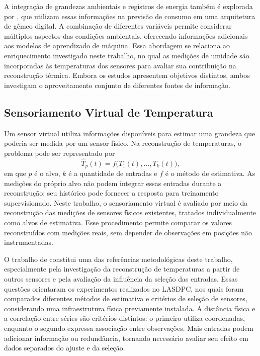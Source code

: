 A integração de grandezas ambientais e registros de energia também
é explorada por , que utilizam essas
informações na previsão de consumo em uma arquitetura de gêmeo digital. A combinação de diferentes variáveis permite considerar múltiplos aspectos das condições ambientais, oferecendo informações adicionais aos modelos de aprendizado de máquina. Essa abordagem se relaciona ao enriquecimento investigado neste trabalho, no qual as medições de umidade são incorporadas às temperaturas dos sensores para avaliar sua contribuição na reconstrução térmica. Embora os estudos apresentem objetivos distintos, ambos investigam o aproveitamento conjunto de diferentes fontes de informação.

\subsection{Sensoriamento Virtual de Temperatura}
\label{subsec:sensoriamento_virtual}

Um sensor virtual utiliza informações disponíveis para estimar uma
grandeza que poderia ser medida por um sensor físico. Na reconstrução
de temperaturas, o problema pode ser representado por
\begin{equation}
    \widehat{T}_p(t)=f\bigl(T_1(t),\ldots,T_k(t)\bigr),
    \label{eq:sensoriamento_virtual}
\end{equation}
em que $p$ é o alvo, $k$ é a quantidade de entradas e $f$ é o método
de estimativa. As medições do próprio alvo não podem integrar essas
entradas durante a reconstrução; seu histórico pode fornecer a resposta
para treinamento supervisionado. Neste trabalho, o sensoriamento virtual é avaliado por meio da reconstrução das medições de sensores físicos existentes, tratados individualmente como alvos de estimativa. Esse procedimento permite comparar os valores reconstruídos com medições reais, sem depender de observações em posições não instrumentadas.

O trabalho de  constitui uma das referências metodológicas deste trabalho, especialmente pela investigação da reconstrução de temperaturas a partir de outros sensores e pela avaliação da influência da seleção das entradas. Essas questões orientaram os experimentos realizados no LASDPC, nos quais foram comparados diferentes métodos de estimativa e critérios de seleção de sensores, considerando uma infraestrutura física previamente instalada.
A distância física e a correlação entre
séries são critérios distintos: o primeiro utiliza coordenadas, enquanto
o segundo expressa associação entre observações. Mais entradas podem
adicionar informação ou redundância, tornando necessário avaliar seu
efeito em dados separados do ajuste e da seleção.


